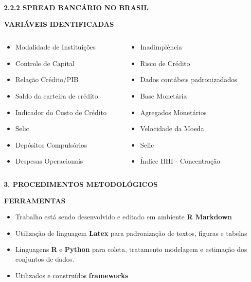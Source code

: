 \documentclass[ignorenonframetext,aspectratio=169,ignorenonframetext]{beamer}
\providecommand{\tightlist}{%
  \setlength{\itemsep}{0pt}\setlength{\parskip}{0pt}}
\begin{document}
\begin{frame}{\textbf{2.2.2 SPREAD BANCÁRIO NO BRASIL}}
\protect\hypertarget{spread-bancuxe1rio-no-brasil-3}{}

\textbf{VARIÁVEIS IDENTIFICADAS}

\begin{columns}[T]
\begin{column}{0.5\textwidth}
\begin{itemize}
\tightlist
\item
  Modalidade de Instituições
\item
  Controle de Capital
\item
  Relação Crédito/PIB
\item
  Saldo da carteira de crédito
\item
  Indicador do Custo de Crédito
\item
  Selic
\item
  Depósitos Compulsórios
\item
  Despesas Operacionais
\end{itemize}
\end{column}

\begin{column}{0.5\textwidth}
\begin{itemize}
\tightlist
\item
  Inadimplência
\item
  Risco de Crédito
\item
  Dados contábeis padronizadados
\item
  Base Monetária
\item
  Agregados Monetários
\item
  Velocidade da Moeda
\item
  Selic
\item
  Índice HHI - Concentração
\end{itemize}
\end{column}
\end{columns}

\end{frame}

\begin{frame}{\textbf{3. PROCEDIMENTOS METODOLÓGICOS}}
\protect\hypertarget{procedimentos-metodoluxf3gicos}{}

\textbf{FERRAMENTAS}

\begin{itemize}
\item
  Trabalho está sendo desenvolvido e editado em ambiente \textbf{R
  Markdown}
\item
  Utilização de linguagem \textbf{Latex} para padronização de textos,
  figuras e tabelas
\item
  Linguagens \textbf{R} e \textbf{Python} para coleta, tratamento
  modelagem e estimação dos conjuntos de dados.
\item
  Utilizados e construídos \textbf{frameworks}
\end{itemize}

\end{frame}
\end{document}
